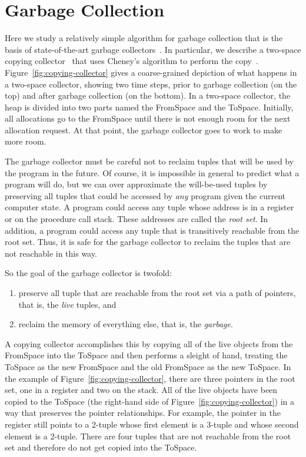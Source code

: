 \documentclass[11pt]{book}
\begin{document}
{\section{Garbage Collection}
\label{sec:GC}

Here we study a relatively simple algorithm for garbage collection
that is the basis of state-of-the-art garbage
collectors~\citep{Lieberman:1983aa,Ungar:1984aa,Jones:1996aa,Detlefs:2004aa,Dybvig:2006aa,Tene:2011kx}. In
particular, we describe a two-space copying
collector~\citep{Wilson:1992fk} that uses Cheney's algorithm to
perform the
copy~\citep{Cheney:1970aa}.
Figure~\ref{fig:copying-collector} gives a
coarse-grained depiction of what happens in a two-space collector,
showing two time steps, prior to garbage collection (on the top) and
after garbage collection (on the bottom). In a two-space collector,
the heap is divided into two parts named the FromSpace and the
ToSpace. Initially, all allocations go to the FromSpace until there is
not enough room for the next allocation request. At that point, the
garbage collector goes to work to make more room.

The garbage collector must be careful not to reclaim tuples that will
be used by the program in the future. Of course, it is impossible in
general to predict what a program will do, but we can over approximate
the will-be-used tuples by preserving all tuples that could be
accessed by \emph{any} program given the current computer state.  A
program could access any tuple whose address is in a register or on
the procedure call stack. These addresses are called the \emph{root
  set}. In addition, a program could access any tuple that is
transitively reachable from the root set. Thus, it is safe for the
garbage collector to reclaim the tuples that are not reachable in this
way.

So the goal of the garbage collector is twofold:
\begin{enumerate}
\item preserve all tuple that are reachable from the root set via a
  path of pointers, that is, the \emph{live} tuples, and
\item reclaim the memory of everything else, that is, the
  \emph{garbage}.
\end{enumerate}
A copying collector accomplishes this by copying all of the live
objects from the FromSpace into the ToSpace and then performs a sleight
of hand, treating the ToSpace as the new FromSpace and the old
FromSpace as the new ToSpace.  In the example of
Figure~\ref{fig:copying-collector}, there are three pointers in the
root set, one in a register and two on the stack.  All of the live
objects have been copied to the ToSpace (the right-hand side of
Figure~\ref{fig:copying-collector}) in a way that preserves the
pointer relationships. For example, the pointer in the register still
points to a 2-tuple whose first element is a 3-tuple and whose second
element is a 2-tuple.  There are four tuples that are not reachable
from the root set and therefore do not get copied into the ToSpace.

}
\end{document}
